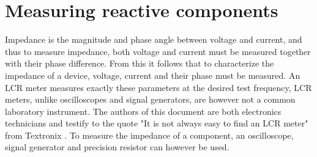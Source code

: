 \section{Measuring reactive components} \label{sec:MeasureReactiveComponents}
Impedance is the magnitude and phase angle between voltage and current, and thus to measure impedance, both voltage and current must be measured together with
their phase difference. From this it follows that to characterize the impedance of a device, voltage, current and their phase must be measured. An LCR meter measures exactly these parameters
at the desired test frequency, LCR meters, unlike oscilloscopes and signal generators, are however not a common laboratory instrument. The authors of this document are both
electronics technicians and testify to the quote "It is not always easy to find an LCR meter" from Textronix \Cite{TextronixZMeas}. To measure the impedance of a component, an oscilloscope, signal generator and precision resistor can however be used. 
